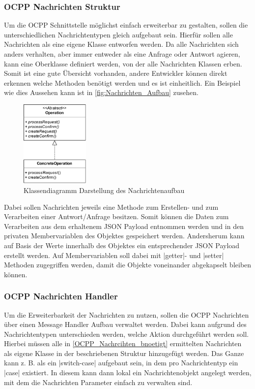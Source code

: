 \subsubsection{OCPP Nachrichten Struktur}
Um die OCPP Schnittstelle möglichst einfach erweiterbar zu gestalten, sollen die unterschiedlichen Nachrichtentypen gleich aufgebaut sein. Hierfür sollen alle Nachrichten als eine eigene Klasse entworfen werden. Da alle Nachrichten sich anders verhalten, aber immer entweder als eine Anfrage oder Antwort agieren, kann eine Oberklasse definiert werden, von der alle Nachrichten Klassen erben. Somit ist eine gute Übersicht vorhanden, andere Entwickler können direkt erkennen welche Methoden benötigt werden und es ist einheitlich. Ein Beispiel wie dies Aussehen kann ist in \autoref{fig:Nachrichten_Aufbau} zusehen.
\begin{figure}[H]
	\centering
	\includegraphics[width=0.3\textwidth]{images/Architektur/Nachrichten_Aufbau.png}
	\caption{Klassendiagramm Darstellung des Nachrichtenaufbau\cite{Eigene_Darstellung}}
	\label{fig:Nachrichten_Aufbau}
\end{figure}
\noindent Dabei sollen Nachrichten jeweils eine Methode zum Erstellen- und zum Verarbeiten einer Antwort/Anfrage besitzen. Somit können die Daten zum Verarbeiten aus dem erhaltenem JSON Payload entnommen werden und in den privaten Membervariablen des Objektes gespeichert werden. Andersherum kann auf Basis der Werte innerhalb des Objektes ein entsprechender JSON Payload erstellt werden. Auf Membervariablen soll dabei mit \spverb|getter|- und \spverb|setter| Methoden zugegriffen werden, damit die Objekte voneinander abgekapselt bleiben können.
\subsubsection{OCPP Nachrichten Handler}
Um die Erweiterbarkeit der Nachrichten zu nutzen, sollen die OCPP Nachrichten über einen Message Handler Aufbau verwaltet werden. Dabei kann aufgrund des Nachrichtentypen unterschieden werden, welche Aktion durchgeführt werden soll. Hierbei müssen alle in \autoref{OCPP_Nachrcihten_bnoetigt} ermittelten Nachrichten als eigene Klasse in der beschriebenen Struktur hinzugefügt werden. Das Ganze kann z. B. als ein \spverb|switch-case| aufgebaut sein, in dem pro Nachrichtentyp ein \spverb|case| existiert. In diesem kann dann lokal ein Nachrichtenobjekt angelegt werden, mit dem die Nachrichten Parameter einfach zu verwalten sind.
